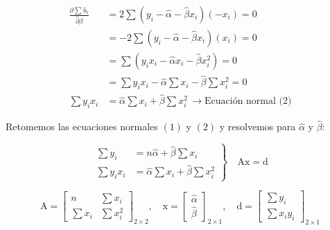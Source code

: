\documentclass[
]{book}
\begin{document}
\[
\begin{aligned}
\frac{ \partial \sum \hat{u}_{i} }{ \hat{\partial} \beta } &= 2 \sum (y_{i} - \hat{\alpha } - \hat{\beta}x_{i})(-x_{i}) = 0  \\
&= -2 \sum (y_{i} - \hat{\alpha } - \hat{\beta}x_{i})(x_{i}) = 0 \\
&= \sum (y_{i}x_{i} - \hat{\alpha } x_{i} - \hat{\beta}x_{i}^2) = 0 \\
&= \sum y_{i}x_{i} - \hat{\alpha }\sum x_{i} - \hat{\beta}\sum x_{i}^2 = 0 \\
\sum y_{i}x_{i} &= \hat{\alpha }\sum x_{i} + \hat{\beta}\sum x_{i}^2 \, \rightarrow \text{Ecuación normal (2)}
\end{aligned}
\]

Retomemos las ecuaciones normales \((1)\) y \((2)\) y resolvemos para \(\hat \alpha\) y \(\hat \beta\):

\[
\left .  
\begin{aligned}  
\sum y_{i} &= n \hat{\alpha } + \hat{\beta}\sum x_{i} \\
\sum y_{i}x_{i} &= \hat{\alpha }\sum x_{i} + \hat{\beta}\sum x_{i}^2 
\end{aligned} 
\right\}  
\quad \mathrm{Ax = d}
\]

\[
\mathrm{A} = 
\begin{bmatrix}
n & \sum x_{i} \\
\sum x_{i} & \sum x_{i}^2
\end{bmatrix}_{2 \times 2}
,
\quad 
\mathrm{x} =
\begin{bmatrix}
\hat{\alpha} \\
\hat{ \beta}
\end{bmatrix}_{2 \times 1}
,
\quad
\mathrm{d} = 
\begin{bmatrix}
\sum y_{i}  \\
\sum x_{i} y_{i}
\end{bmatrix}_{2 \times 1}
\]

  
\end{document}
